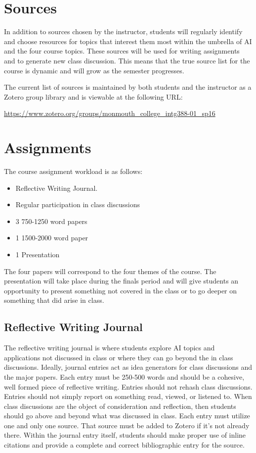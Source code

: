\documentclass[nobib]{tufte-handout}
\begin{document}
\section{Sources}

In addition to sources chosen by the instructor, students will regularly identify and choose resources for topics that interest them most within the umbrella of AI and the four course topics. These sources will be used for writing assignments and to generate new class discussion.  This means that the true source list for the course is dynamic and will grow as the semester progresses.

The current list of sources is maintained by both students and the instructor as a Zotero group library and is viewable at the following URL:
\vspace{.2in}

\begin{footnotesize}
\url{https://www.zotero.org/groups/monmouth_college_intg388-01_sp16}
\end{footnotesize}


\section{Assignments}

The course assignment workload is as follows:
\begin{itemize}
\item Reflective Writing Journal.
\item Regular participation in class discussions
\item 3 750-1250 word papers
\item 1 1500-2000 word paper
\item 1 Presentation
\end{itemize}
The four papers will correspond to the four themes of the course. The presentation will take place during the finals period and will give students an opportunity to present something not covered in the class or to go deeper on something that did arise in class.

\subsection{Reflective Writing Journal}

The reflective writing journal is where students explore AI topics and applications not discussed in class or where they can go beyond the in class discussions. Ideally, journal entries act as idea generators for class discussions and the major papers. Each entry must be 250-500 words and should be a cohesive, well formed piece of reflective writing. Entries should not rehash class discussions. Entries should not simply report on something read, viewed, or listened to. When class discussions are the object of consideration and reflection, then students should go above and beyond what was discussed in class. Each entry must utilize one and only one source. That source must be added to Zotero if it's not already there. Within the journal entry itself, students should make proper use of inline citations and provide a complete and correct bibliographic entry for the source.
\end{document}

